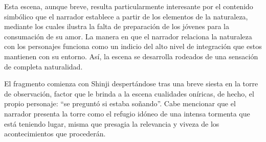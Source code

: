 
Esta escena, aunque breve, resulta particularmente interesante por el contenido simbólico que el narrador establece a partir de los elementos de la naturaleza, mediante los cuales ilustra la falta de preparación de los jóvenes para la consumación de su amor.
La manera en que el narrador relaciona la naturaleza con los personajes funciona como un indicio del alto nivel de integración que estos mantienen con su entorno. 
Así, la escena se desarrolla rodeados de una sensación de completa naturalidad.

El fragmento comienza con Shinji despertándose tras una breve siesta en la torre de observación, factor que le brinda a la escena cualidades oníricas, de hecho, el propio personaje: ``se preguntó si estaba soñando''.\autocite{mishima2006}
Cabe mencionar que el narrador presenta la torre como el refugio idóneo de una intensa tormenta que está teniendo lugar, misma que presagia la relevancia y viveza de los acontecimientos que procederán.

